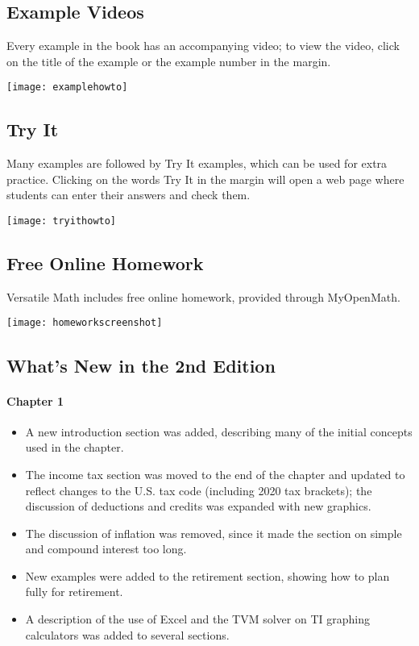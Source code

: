 \vfill
\pagebreak

\subsection{Example Videos}
\parbox{0.75\textwidth}{Every example in the book has an accompanying video; to view the video, click on the title of the example or the example number in the margin.}
\begin{center}
\texttt{[image: examplehowto]}
\end{center}

\subsection{Try It}
\parbox{0.75\textwidth}{Many examples are followed by Try It examples, which can be used for extra practice.  Clicking on the words Try It in the margin will open a web page where students can enter their answers and check them.}
\begin{center}
\texttt{[image: tryithowto]}
\end{center}

\subsection{Free Online Homework}
\parbox{0.75\textwidth}{Versatile Math includes free online homework, provided through MyOpenMath.}
\begin{center}
\texttt{[image: homeworkscreenshot]}
\end{center}
\vfill
\pagebreak

\subsection{What's New in the 2nd Edition}
\paragraph{Chapter 1}
\begin{itemize}
\item A new introduction section was added, describing many of the initial concepts used in the chapter.
\item The income tax section was moved to the end of the chapter and updated to reflect changes to the U.S. tax code (including 2020 tax brackets); the discussion of deductions and credits was expanded with new graphics.
\item The discussion of inflation was removed, since it made the section on simple and compound interest too long.
\item New examples were added to the retirement section, showing how to plan fully for retirement.
\item A description of the use of Excel and the TVM solver on TI graphing calculators was added to several sections. 
\end{itemize}

